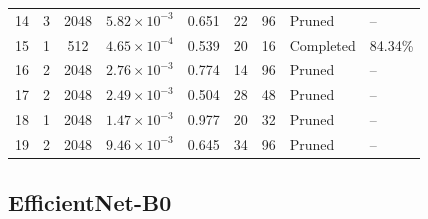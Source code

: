 {\begin{longtable}{lccccccll}
14 & 3 & 2048 & $5.82\times10^{-3}$ & 0.651 & 22 & 96 & Pruned & -- \\
15 & 1 & 512 & $4.65\times10^{-4}$ & 0.539 & 20 & 16 & Completed & 84.34\% \\
16 & 2 & 2048 & $2.76\times10^{-3}$ & 0.774 & 14 & 96 & Pruned & -- \\
17 & 2 & 2048 & $2.49\times10^{-3}$ & 0.504 & 28 & 48 & Pruned & -- \\
18 & 1 & 2048 & $1.47\times10^{-3}$ & 0.977 & 20 & 32 & Pruned & -- \\
19 & 2 & 2048 & $9.46\times10^{-3}$ & 0.645 & 34 & 96 & Pruned & -- \\
\end{longtable}
}

\Needspace*{0.6\textheight}
\subsection{EfficientNet-B0}


